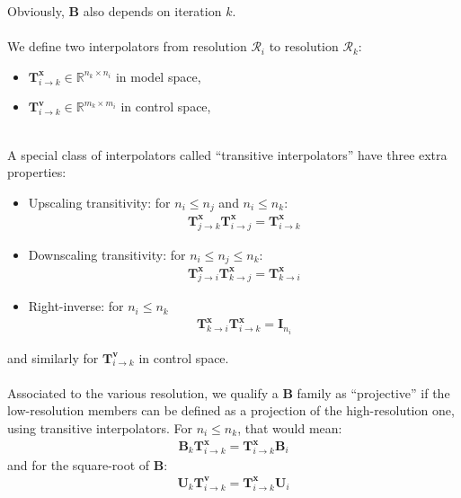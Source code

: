 \documentclass[12pt]{scrartcl}
\begin{document}
Obviously, $\mathbf{B}$ also depends on iteration $k$.\\
$  $\\
We define two interpolators from resolution $\mathcal{R}_i$ to resolution $\mathcal{R}_k$:
\begin{itemize}
\item $\mathbf{T}^\mathbf{x}_{i \rightarrow k} \in \mathbb{R}^{n_k \times n_i}$ in model space,
\item $\mathbf{T}^\mathbf{v}_{i \rightarrow k} \in \mathbb{R}^{m_k \times m_i}$ in control space,
\end{itemize}
$  $\\
A special class of interpolators called ``transitive interpolators'' have three extra properties:
\begin{itemize}
\item Upscaling transitivity: for $n_i \le n_j$ and $n_i \le n_k$:
\begin{align}
\mathbf{T}^\mathbf{x}_{j \rightarrow k} \mathbf{T}^\mathbf{x}_{i \rightarrow j} = \mathbf{T}^\mathbf{x}_{i \rightarrow k}
\end{align}
\item Downscaling transitivity: for $n_i \le n_j \le n_k$:
\begin{align}
\mathbf{T}^\mathbf{x}_{j \rightarrow i} \mathbf{T}^\mathbf{x}_{k \rightarrow j} = \mathbf{T}^\mathbf{x}_{k \rightarrow i}
\end{align}
\item Right-inverse: for $n_i \le n_k$
\begin{align}
\mathbf{T}^\mathbf{x}_{k \rightarrow i} \mathbf{T}^\mathbf{x}_{i \rightarrow k} = \mathbf{I}_{n_i}
\end{align}
\end{itemize}
and similarly for $\mathbf{T}^\mathbf{v}_{i \rightarrow k}$ in control space.\\
$  $\\
Associated to the various resolution, we qualify a $\mathbf{B}$ family as ``projective'' if the low-resolution members can be defined as a projection of the high-resolution one, using transitive interpolators. For $n_i \le n_k$, that would mean:
\begin{align}
\label{eq:projective_definition_B}
\mathbf{B}_k \mathbf{T}^\mathbf{x}_{i \rightarrow k} = \mathbf{T}^\mathbf{x}_{i \rightarrow k} \mathbf{B}_i
\end{align}
and for the square-root of $\mathbf{B}$:
\begin{align}
\label{eq:projective_definition_U}
\mathbf{U}_k \mathbf{T}^\mathbf{v}_{i \rightarrow k} = \mathbf{T}^\mathbf{x}_{i \rightarrow k} \mathbf{U}_i
\end{align}
\end{document}
